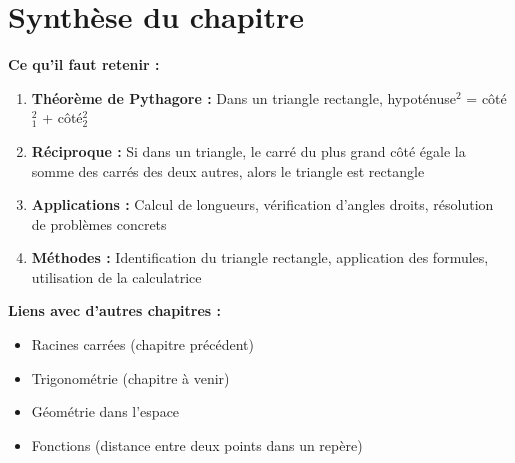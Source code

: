 %
%

\section{Synthèse du chapitre}

\textbf{Ce qu'il faut retenir :}

\begin{enumerate}
    \item \textbf{Théorème de Pythagore :} Dans un triangle rectangle, hypoténuse$^2$ = côté$_1^2$ + côté$_2^2$
    \item \textbf{Réciproque :} Si dans un triangle, le carré du plus grand côté égale la somme des carrés des deux autres, alors le triangle est rectangle
    \item \textbf{Applications :} Calcul de longueurs, vérification d'angles droits, résolution de problèmes concrets
    \item \textbf{Méthodes :} Identification du triangle rectangle, application des formules, utilisation de la calculatrice
\end{enumerate}

\textbf{Liens avec d'autres chapitres :}
\begin{itemize}
    \item Racines carrées (chapitre précédent)
    \item Trigonométrie (chapitre à venir)
    \item Géométrie dans l'espace
    \item Fonctions (distance entre deux points dans un repère)
\end{itemize} 